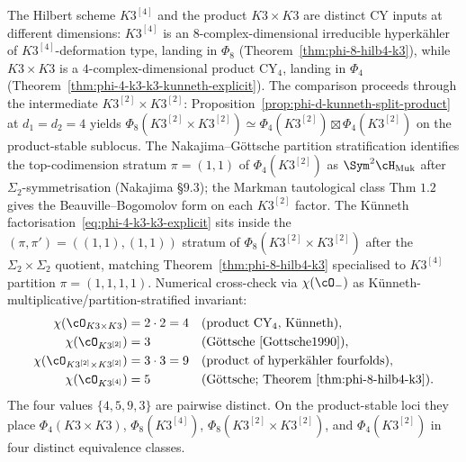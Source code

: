 \begin{remark}
\label{rem:phi-4-k3-k3-markman-phi8}
%
The Hilbert scheme $K3^{[4]}$ and the product $K3 \times K3$ are distinct CY inputs at different dimensions: $K3^{[4]}$ is an $8$-complex-dimensional irreducible hyperk\"ahler of $K3^{[4]}$-deformation type, landing in $\Phi_8$ (Theorem~\textup{\ref{thm:phi-8-hilb4-k3}}), while $K3 \times K3$ is a $4$-complex-dimensional product CY$_4$, landing in $\Phi_4$ (Theorem~\textup{\ref{thm:phi-4-k3-k3-kunneth-explicit}}). The comparison proceeds through the intermediate $K3^{[2]} \times K3^{[2]}$: Proposition~\textup{\ref{prop:phi-d-kunneth-split-product}} at $d_1 = d_2 = 4$ yields $\Phi_8(K3^{[2]} \times K3^{[2]}) \simeq \Phi_4(K3^{[2]}) \boxtimes \Phi_4(K3^{[2]})$ on the product-stable sublocus. The Nakajima--G\"ottsche partition stratification identifies the top-codimension stratum $\pi = (1,1)$ of $\Phi_4(K3^{[2]})$ as $\Sym^2 \cH_{\mathrm{Muk}}$ after $\Sigma_2$-symmetrisation (Nakajima \cite{Nakajima1999} \S$9.3$); the Markman tautological class \cite{Markman2010IMRN} Thm $1.2$ gives the Beauville--Bogomolov form on each $K3^{[2]}$ factor. The K\"unneth factorisation~\eqref{eq:phi-4-k3-k3-explicit} sits inside the $(\pi, \pi') = ((1,1), (1,1))$ stratum of $\Phi_8(K3^{[2]} \times K3^{[2]})$ after the $\Sigma_2 \times \Sigma_2$ quotient, matching Theorem~\textup{\ref{thm:phi-8-hilb4-k3}} specialised to $K3^{[4]}$ partition $\pi = (1,1,1,1)$. Numerical cross-check via $\chi(\cO_{-})$ as K\"unneth-multiplicative/partition-stratified invariant:
\begin{align*}
\chi(\cO_{K3 \times K3}) &= 2 \cdot 2 = 4 & &\text{(product CY$_4$, K\"unneth)}, \\
\chi(\cO_{K3^{[2]}}) &= 3 & &\text{(G\"ottsche \cite{Gottsche1990})}, \\
\chi(\cO_{K3^{[2]} \times K3^{[2]}}) &= 3 \cdot 3 = 9 & &\text{(product of hyperk\"ahler fourfolds)}, \\
\chi(\cO_{K3^{[4]}}) &= 5 & &\text{(G\"ottsche; Theorem~\textup{\ref{thm:phi-8-hilb4-k3}})}.
\end{align*}
The four values $\{4, 5, 9, 3\}$ are pairwise distinct.  On the
product-stable loci they place $\Phi_4(K3 \times K3)$,
$\Phi_8(K3^{[4]})$, $\Phi_8(K3^{[2]} \times K3^{[2]})$, and
$\Phi_4(K3^{[2]})$ in four distinct equivalence classes.
\end{remark}

